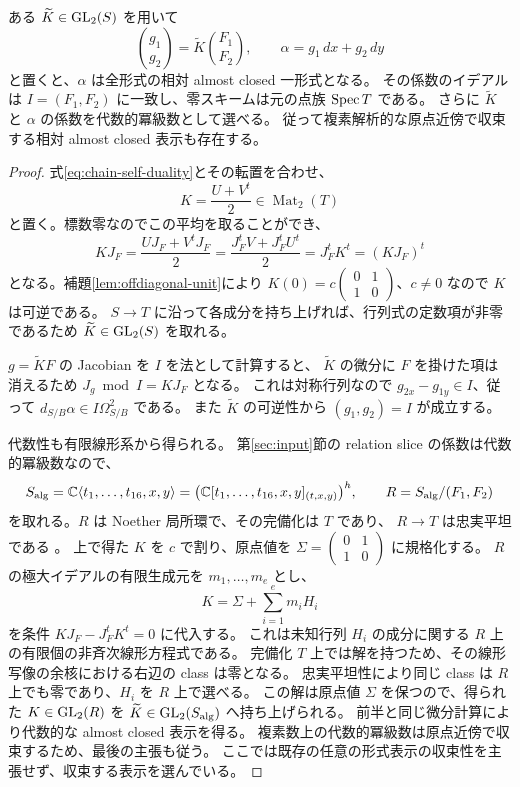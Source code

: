 \begin{proposition}\label{prop:relative-almost-closed}
ある $\widetilde K\in\operatorname{GL}_2(S)$ を用いて
\[
 \binom{g_1}{g_2}=\widetilde K\binom{F_1}{F_2},\qquad
 \alpha=g_1\,dx+g_2\,dy
\]
と置くと、$\alpha$ は全形式の相対 almost closed 一形式となる。
その係数のイデアルは $I=(F_1,F_2)$ に一致し、零スキームは元の点族 $\operatorname{Spec} T$ である。
さらに $\widetilde K$ と $\alpha$ の係数を代数的冪級数として選べる。
従って複素解析的な原点近傍で収束する相対 almost closed 表示も存在する。
\end{proposition}

\begin{proof}
式\eqref{eq:chain-self-duality}とその転置を合わせ、
\[
 K=\frac{U+V^t}{2}\in\operatorname{Mat}_2(T)
\]
と置く。標数零なのでこの平均を取ることができ、
\[
 KJ_F=\frac{UJ_F+V^tJ_F}{2}
      =\frac{J_F^tV+J_F^tU^t}{2}
      =J_F^tK^t=(KJ_F)^t
\]
となる。補題\ref{lem:offdiagonal-unit}により
$K(0)=c\left(\begin{smallmatrix}0&1\\1&0\end{smallmatrix}\right)$、$c\ne0$ なので
$K$ は可逆である。
$S\to T$ に沿って各成分を持ち上げれば、行列式の定数項が非零であるため
$\widetilde K\in\operatorname{GL}_2(S)$ を取れる。

$g=\widetilde K F$ の Jacobian を $I$ を法として計算すると、
$\widetilde K$ の微分に $F$ を掛けた項は消えるため
$J_g\bmod I=KJ_F$ となる。
これは対称行列なので $g_{2x}-g_{1y}\in I$、従って
$d_{S/B}\alpha\in I\Omega^2_{S/B}$ である。
また $\widetilde K$ の可逆性から $(g_1,g_2)=I$ が成立する。

代数性も有限線形系から得られる。
第\ref{sec:input}節の relation slice の係数は代数的冪級数なので、
\[
 S_{\mathrm{alg}}=\mathbb C\langle t_1,\ldots,t_{16},x,y\rangle
 =\bigl(\mathbb C[t_1,\ldots,t_{16},x,y]_{(t,x,y)}\bigr)^h,
 \qquad R=S_{\mathrm{alg}}/(F_1,F_2)
\]
を取れる。$R$ は Noether 局所環で、その完備化は $T$ であり、
$R\to T$ は忠実平坦である \cite[Tags 00MC,0A1W]{Stacks}。
上で得た $K$ を $c$ で割り、原点値を
$\Sigma=\left(\begin{smallmatrix}0&1\\1&0\end{smallmatrix}\right)$ に規格化する。
$R$ の極大イデアルの有限生成元を $m_1,\ldots,m_e$ とし、
\[
 K=\Sigma+\sum_{i=1}^e m_iH_i
\]
を条件 $KJ_F-J_F^tK^t=0$ に代入する。
これは未知行列 $H_i$ の成分に関する $R$ 上の有限個の非斉次線形方程式である。
完備化 $T$ 上では解を持つため、その線形写像の余核における右辺の class は零となる。
忠実平坦性により同じ class は $R$ 上でも零であり、$H_i$ を $R$ 上で選べる。
この解は原点値 $\Sigma$ を保つので、得られた $K\in\operatorname{GL}_2(R)$ を
$\widetilde K\in\operatorname{GL}_2(S_{\mathrm{alg}})$ へ持ち上げられる。
前半と同じ微分計算により代数的な almost closed 表示を得る。
複素数上の代数的冪級数は原点近傍で収束するため、最後の主張も従う。
ここでは既存の任意の形式表示の収束性を主張せず、収束する表示を選んでいる。
\end{proof}

